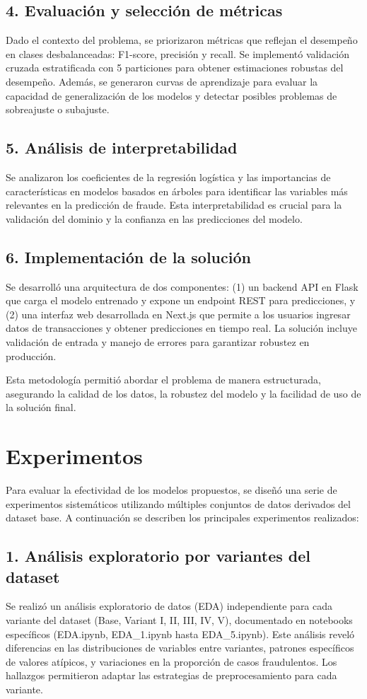 \documentclass{llncs}
\begin{document}
\subsection{4. Evaluación y selección de métricas}
Dado el contexto del problema, se priorizaron métricas que reflejan el desempeño en clases desbalanceadas: F1-score, precisión y recall. Se implementó validación cruzada estratificada con 5 particiones para obtener estimaciones robustas del desempeño. Además, se generaron curvas de aprendizaje para evaluar la capacidad de generalización de los modelos y detectar posibles problemas de sobreajuste o subajuste.

\subsection{5. Análisis de interpretabilidad}
Se analizaron los coeficientes de la regresión logística y las importancias de características en modelos basados en árboles para identificar las variables más relevantes en la predicción de fraude. Esta interpretabilidad es crucial para la validación del dominio y la confianza en las predicciones del modelo.

\subsection{6. Implementación de la solución}
Se desarrolló una arquitectura de dos componentes: (1) un backend API en Flask que carga el modelo entrenado y expone un endpoint REST para predicciones, y (2) una interfaz web desarrollada en Next.js que permite a los usuarios ingresar datos de transacciones y obtener predicciones en tiempo real. La solución incluye validación de entrada y manejo de errores para garantizar robustez en producción.

Esta metodología permitió abordar el problema de manera estructurada, asegurando la calidad de los datos, la robustez del modelo y la facilidad de uso de la solución final.

\section{Experimentos}

Para evaluar la efectividad de los modelos propuestos, se diseñó una serie de experimentos sistemáticos utilizando múltiples conjuntos de datos derivados del dataset base. A continuación se describen los principales experimentos realizados:

\subsection{1. Análisis exploratorio por variantes del dataset}
Se realizó un análisis exploratorio de datos (EDA) independiente para cada variante del dataset (Base, Variant I, II, III, IV, V), documentado en notebooks específicos (EDA.ipynb, EDA\_1.ipynb hasta EDA\_5.ipynb). Este análisis reveló diferencias en las distribuciones de variables entre variantes, patrones específicos de valores atípicos, y variaciones en la proporción de casos fraudulentos. Los hallazgos permitieron adaptar las estrategias de preprocesamiento para cada variante.
\end{document}
